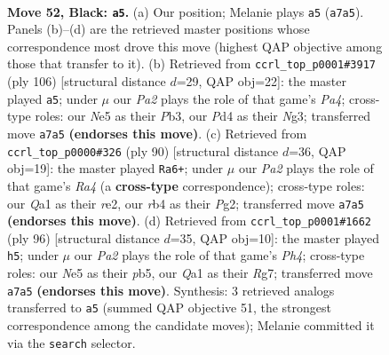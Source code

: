 \documentclass[11pt]{article}
\begin{document}
\clearpage

\begin{figure}[p]\centering
\begin{subfigure}{0.46\textwidth}\centering
\resizebox{\linewidth}{!}{%
\newchessgame
\chessboard[
  setfen={8/p1k4p/8/4nr2/1R1p4/8/4P3/qNK5 b - - 0 52},
  showmover=false,
  pgfstyle=straightmove, color=movearrow, markmove={a7-a5}
]}
\caption{}
\end{subfigure}\hfill
\begin{subfigure}{0.46\textwidth}\centering
\resizebox{\linewidth}{!}{%
\newchessgame
\chessboard[
  setfen={8/r5n1/6R1/4P3/P7/1P4N1/1K4kp/8 w - - 4 54},
  showmover=false,
  pgfstyle=straightmove, color=movearrow, markmove={a4-a5}
]}
\caption{}
\end{subfigure}
\\[4pt]
\begin{subfigure}{0.46\textwidth}\centering
\resizebox{\linewidth}{!}{%
\newchessgame
\chessboard[
  setfen={8/4n3/4k1pp/8/RP5P/8/3Nr1PK/8 w - - 4 46},
  showmover=false,
  pgfstyle=straightmove, color=movearrow, markmove={a4-a6}
]}
\caption{}
\end{subfigure}\hfill
\begin{subfigure}{0.46\textwidth}\centering
\resizebox{\linewidth}{!}{%
\newchessgame
\chessboard[
  setfen={8/3n2R1/3k4/1p6/1P4PP/8/2r5/6K1 w - - 0 49},
  showmover=false,
  pgfstyle=straightmove, color=movearrow, markmove={h4-h5}
]}
\caption{}
\end{subfigure}
\caption{\textbf{Move 52, Black: \texttt{a5}.} (a) Our position; Melanie plays \texttt{a5} (\texttt{a7a5}). Panels (b)--(d) are the retrieved master positions whose correspondence most drove this move (highest QAP objective among those that transfer to it). (b) Retrieved from \texttt{ccrl\_top\_p0001\#3917} (ply 106) [structural distance $d$=29, QAP obj=22]: the master played \texttt{a5}; under $\mu$ our \emph{Pa2} plays the role of that game's \emph{Pa4}; cross-type roles: our \emph{N}e5 as their \emph{P}b3, our \emph{P}d4 as their \emph{N}g3; transferred move \texttt{a7a5} \textbf{(endorses this move)}. (c) Retrieved from \texttt{ccrl\_top\_p0000\#326} (ply 90) [structural distance $d$=36, QAP obj=19]: the master played \texttt{Ra6+}; under $\mu$ our \emph{Pa2} plays the role of that game's \emph{Ra4} (a \textbf{cross-type} correspondence); cross-type roles: our \emph{Q}a1 as their \emph{r}e2, our \emph{r}b4 as their \emph{P}g2; transferred move \texttt{a7a5} \textbf{(endorses this move)}. (d) Retrieved from \texttt{ccrl\_top\_p0001\#1662} (ply 96) [structural distance $d$=35, QAP obj=10]: the master played \texttt{h5}; under $\mu$ our \emph{Pa2} plays the role of that game's \emph{Ph4}; cross-type roles: our \emph{N}e5 as their \emph{p}b5, our \emph{Q}a1 as their \emph{R}g7; transferred move \texttt{a7a5} \textbf{(endorses this move)}. Synthesis: 3 retrieved analogs transferred to \texttt{a5} (summed QAP objective 51, the strongest correspondence among the candidate moves); Melanie committed it via the \texttt{search} selector.}
\label{fig:thought-m103}
\end{figure}
\end{document}
